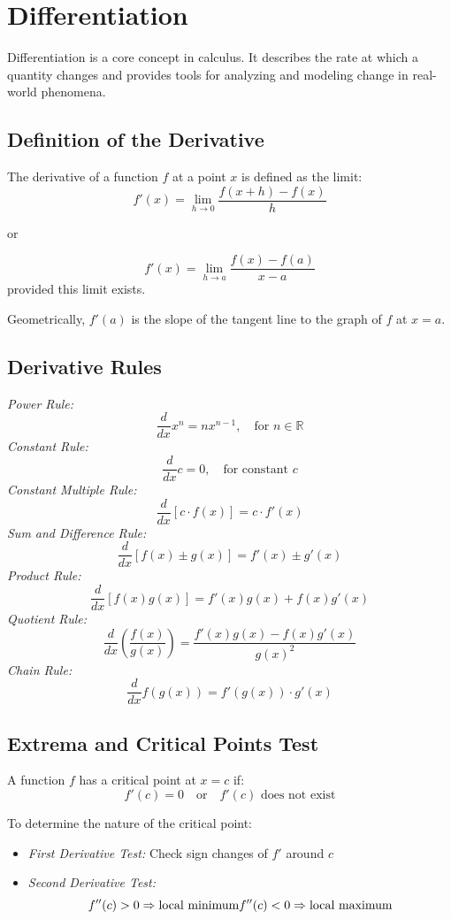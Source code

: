 \newpage
\section{Differentiation}

Differentiation is a core concept in calculus. It describes the rate at which a quantity changes and provides tools for analyzing and modeling change in real-world phenomena.

\subsection{Definition of the Derivative}

The derivative of a function \(f\) at a point \(x\) is defined as the limit:
\[
f'(x) = \lim_{h \to 0} \frac{f(x + h) - f(x)}{h}
\]

or

\[f'(x) = \lim_{h \to a}\frac{f(x) - f(a)}{x - a}\]
provided this limit exists.
\vspace{\baselineskip}

Geometrically, \(f'(a)\) is the slope of the tangent line to the graph of \(f\) at \(x = a\).

\subsection{Derivative Rules}

\emph{Power Rule:}
\[
\frac{d}{dx} x^n = nx^{n - 1}, \quad \text{for } n \in \mathbb{R}
\]
\emph{Constant Rule:}
\[
\frac{d}{dx} c = 0, \quad \text{for constant } c
\]
\emph{Constant Multiple Rule:}
\[
\frac{d}{dx} [c \cdot f(x)] = c \cdot f'(x)
\]
\emph{Sum and Difference Rule:}
\[
\frac{d}{dx} [f(x) \pm g(x)] = f'(x) \pm g'(x)
\]
\emph{Product Rule:}
\[
\frac{d}{dx} [f(x)g(x)] = f'(x)g(x) + f(x)g'(x)
\]
\emph{Quotient Rule:}
\[
\frac{d}{dx} \left( \frac{f(x)}{g(x)} \right) = \frac{f'(x)g(x) - f(x)g'(x)}{{g(x)}^2}
\]
\emph{Chain Rule:}
\[
\frac{d}{dx} f(g(x)) = f'(g(x)) \cdot g'(x)
\]

\subsection{Extrema and Critical Points Test}

A function \(f\) has a critical point at \(x = c\) if:
\[
f'(c) = 0 \quad \text{or} \quad f'(c) \text{ does not exist}
\]

To determine the nature of the critical point:
\begin{itemize}[label=\(-\)]
\item \emph{First Derivative Test:} Check sign changes of \(f'\) around \(c\)
\item \emph{Second Derivative Test:}
\[
f''(c) > 0 \Rightarrow \text{local minimum} \\
f''(c) < 0 \Rightarrow \text{local maximum}
\]
\end{itemize}

